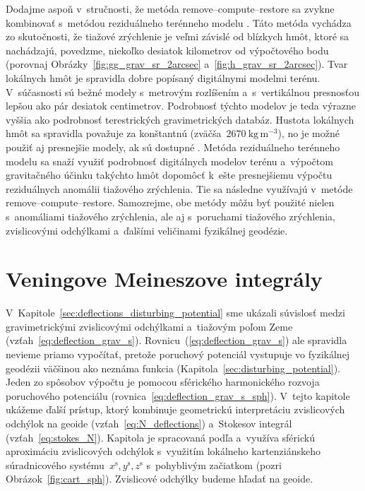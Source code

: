 \documentclass[a4paper, 12pt]{book}
\begin{document}
Dodajme aspoň v~stručnosti, že metóda remove--compute--restore sa zvykne 
kombinovať s~metódou reziduálneho terénneho modelu 
\parencite{Forsberg1981,Forsberg1984}.  Táto metóda vychádza zo skutočnosti, že 
tiažové zrýchlenie je veľmi závislé od blízkych hmôt, ktoré sa nachádzajú, 
povedzme, niekoľko desiatok kilometrov od výpočtového bodu (porovnaj 
Obrázky~\ref{fig:gg_grav_sr_2arcsec} a~\ref{fig:h_grav_sr_2arcsec}).  Tvar 
lokálnych hmôt je spravidla dobre popísaný digitálnymi modelmi terénu.  
V~súčasnosti sú bežné modely s~metrovým rozlíšením a~s~vertikálnou presnosťou 
lepšou ako pár desiatok centimetrov.  Podrobnosť týchto modelov je teda výrazne 
vyššia ako podrobnosť terestrických gravimetrických databáz.  Hustota lokálnych 
hmôt sa spravidla považuje za konštantnú (zväčša~$2670\ \mathrm{kg}\, 
\mathrm{m}^{-3}$), no je možné použiť aj presnejšie modely, ak sú dostupné 
\parencite[napríklad][]{Yang2018}.  Metóda reziduálneho terénneho modelu sa 
snaží využiť podrobnosť digitálnych modelov terénu a~výpočtom gravitačného 
účinku takýchto hmôt dopomôcť k~ešte presnejšiemu výpočtu reziduálnych anomálii 
tiažového zrýchlenia.  Tie sa následne využívajú v~metóde 
remove--compute--restore.  Samozrejme, obe metódy môžu byť použité nielen 
s~anomáliami tiažového zrýchlenia, ale aj s~poruchami tiažového zrýchlenia, 
zvislicovými odchýlkami a~ďalšími veličinami fyzikálnej geodézie.




\section{Veningove Meineszove integrály}
\label{sec:vm_integral}

V~Kapitole~\ref{sec:deflections_disturbing_potential} sme ukázali súvislosť 
medzi gravimetrickými zvislicovými odchýlkami a~tiažovým poľom Zeme 
(vzťah~\ref{eq:deflection_grav_s}).  Rovnicu~(\ref{eq:deflection_grav_s}) ale 
spravidla nevieme priamo vypočítať, pretože poruchový potenciál vystupuje vo 
fyzikálnej geodézii väčšinou ako neznáma funkcia 
(Kapitola~\ref{sec:disturbing_potential}).  Jeden zo spôsobov výpočtu je 
pomocou sférického harmonického rozvoja poruchového potenciálu 
(rovnica~\ref{eq:deflection_grav_s_sph}).  V~tejto kapitole ukážeme ďalší 
prístup, ktorý kombinuje geometrickú interpretáciu zvislicových odchýlok na 
geoide (vzťah~\ref{eq:N_deflections}) a~Stokesov integrál 
(vzťah~\ref{eq:stokes_N}).  Kapitola je spracovaná podľa 
\textcite{MoritzPhysicalGeodesy} a~využíva sférickú aproximáciu zvislicových 
odchýlok s~využitím lokálneho kartenziánskeho súradnicového 
systému~$x^\mathrm{s}, y^\mathrm{s}, z^\mathrm{s}$ s~pohyblivým začiatkom 
(pozri Obrázok~\ref{fig:cart_sph}).  Zvislicové odchýlky budeme hľadať na 
geoide.
\end{document}
